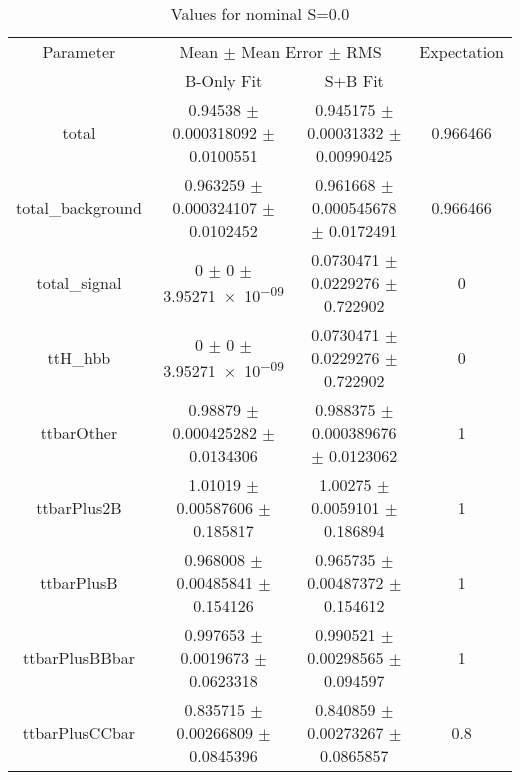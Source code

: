 \begin{table}
\centering
\caption{Values for nominal S=0.0}
\begin{tabular}{cccc}
\toprule
Parameter & \multicolumn{2}{c}{Mean $\pm$ Mean Error $\pm$ RMS} & Expectation\\
 & B-Only Fit & S+B Fit & \\
\midrule
total & \num{0.94538} $\pm$ \num{0.000318092} $\pm$ \num{0.0100551} & \num{0.945175} $\pm$ \num{0.00031332} $\pm$ \num{0.00990425} & \num{0.966466}\\
total\_background & \num{0.963259} $\pm$ \num{0.000324107} $\pm$ \num{0.0102452} & \num{0.961668} $\pm$ \num{0.000545678} $\pm$ \num{0.0172491} & \num{0.966466}\\
total\_signal & \num{0} $\pm$ \num{0} $\pm$ \num{3.95271e-09} & \num{0.0730471} $\pm$ \num{0.0229276} $\pm$ \num{0.722902} & \num{0}\\
ttH\_hbb & \num{0} $\pm$ \num{0} $\pm$ \num{3.95271e-09} & \num{0.0730471} $\pm$ \num{0.0229276} $\pm$ \num{0.722902} & \num{0}\\
ttbarOther & \num{0.98879} $\pm$ \num{0.000425282} $\pm$ \num{0.0134306} & \num{0.988375} $\pm$ \num{0.000389676} $\pm$ \num{0.0123062} & \num{1}\\
ttbarPlus2B & \num{1.01019} $\pm$ \num{0.00587606} $\pm$ \num{0.185817} & \num{1.00275} $\pm$ \num{0.0059101} $\pm$ \num{0.186894} & \num{1}\\
ttbarPlusB & \num{0.968008} $\pm$ \num{0.00485841} $\pm$ \num{0.154126} & \num{0.965735} $\pm$ \num{0.00487372} $\pm$ \num{0.154612} & \num{1}\\
ttbarPlusBBbar & \num{0.997653} $\pm$ \num{0.0019673} $\pm$ \num{0.0623318} & \num{0.990521} $\pm$ \num{0.00298565} $\pm$ \num{0.094597} & \num{1}\\
ttbarPlusCCbar & \num{0.835715} $\pm$ \num{0.00266809} $\pm$ \num{0.0845396} & \num{0.840859} $\pm$ \num{0.00273267} $\pm$ \num{0.0865857} & \num{0.8}\\
\bottomrule
\end{tabular}
\end{table}